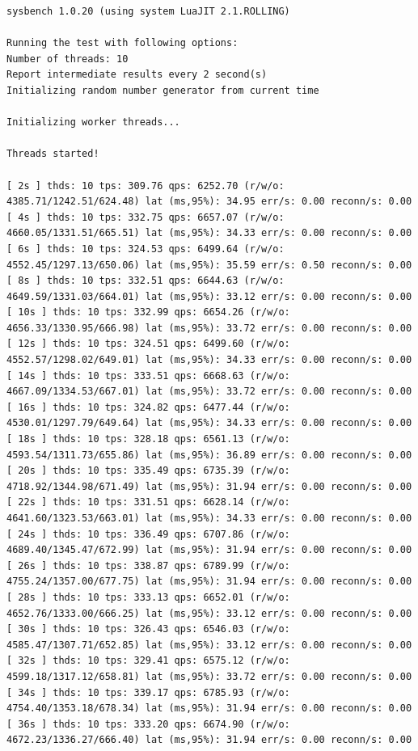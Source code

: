 \documentclass{article}
\begin{document}
\begin{verbatim}
sysbench 1.0.20 (using system LuaJIT 2.1.ROLLING)

Running the test with following options:
Number of threads: 10
Report intermediate results every 2 second(s)
Initializing random number generator from current time

Initializing worker threads...

Threads started!

[ 2s ] thds: 10 tps: 309.76 qps: 6252.70 (r/w/o: 4385.71/1242.51/624.48) lat (ms,95%): 34.95 err/s: 0.00 reconn/s: 0.00
[ 4s ] thds: 10 tps: 332.75 qps: 6657.07 (r/w/o: 4660.05/1331.51/665.51) lat (ms,95%): 34.33 err/s: 0.00 reconn/s: 0.00
[ 6s ] thds: 10 tps: 324.53 qps: 6499.64 (r/w/o: 4552.45/1297.13/650.06) lat (ms,95%): 35.59 err/s: 0.50 reconn/s: 0.00
[ 8s ] thds: 10 tps: 332.51 qps: 6644.63 (r/w/o: 4649.59/1331.03/664.01) lat (ms,95%): 33.12 err/s: 0.00 reconn/s: 0.00
[ 10s ] thds: 10 tps: 332.99 qps: 6654.26 (r/w/o: 4656.33/1330.95/666.98) lat (ms,95%): 33.72 err/s: 0.00 reconn/s: 0.00
[ 12s ] thds: 10 tps: 324.51 qps: 6499.60 (r/w/o: 4552.57/1298.02/649.01) lat (ms,95%): 34.33 err/s: 0.00 reconn/s: 0.00
[ 14s ] thds: 10 tps: 333.51 qps: 6668.63 (r/w/o: 4667.09/1334.53/667.01) lat (ms,95%): 33.72 err/s: 0.00 reconn/s: 0.00
[ 16s ] thds: 10 tps: 324.82 qps: 6477.44 (r/w/o: 4530.01/1297.79/649.64) lat (ms,95%): 34.33 err/s: 0.00 reconn/s: 0.00
[ 18s ] thds: 10 tps: 328.18 qps: 6561.13 (r/w/o: 4593.54/1311.73/655.86) lat (ms,95%): 36.89 err/s: 0.00 reconn/s: 0.00
[ 20s ] thds: 10 tps: 335.49 qps: 6735.39 (r/w/o: 4718.92/1344.98/671.49) lat (ms,95%): 31.94 err/s: 0.00 reconn/s: 0.00
[ 22s ] thds: 10 tps: 331.51 qps: 6628.14 (r/w/o: 4641.60/1323.53/663.01) lat (ms,95%): 34.33 err/s: 0.00 reconn/s: 0.00
[ 24s ] thds: 10 tps: 336.49 qps: 6707.86 (r/w/o: 4689.40/1345.47/672.99) lat (ms,95%): 31.94 err/s: 0.00 reconn/s: 0.00
[ 26s ] thds: 10 tps: 338.87 qps: 6789.99 (r/w/o: 4755.24/1357.00/677.75) lat (ms,95%): 31.94 err/s: 0.00 reconn/s: 0.00
[ 28s ] thds: 10 tps: 333.13 qps: 6652.01 (r/w/o: 4652.76/1333.00/666.25) lat (ms,95%): 33.12 err/s: 0.00 reconn/s: 0.00
[ 30s ] thds: 10 tps: 326.43 qps: 6546.03 (r/w/o: 4585.47/1307.71/652.85) lat (ms,95%): 33.12 err/s: 0.00 reconn/s: 0.00
[ 32s ] thds: 10 tps: 329.41 qps: 6575.12 (r/w/o: 4599.18/1317.12/658.81) lat (ms,95%): 33.72 err/s: 0.00 reconn/s: 0.00
[ 34s ] thds: 10 tps: 339.17 qps: 6785.93 (r/w/o: 4754.40/1353.18/678.34) lat (ms,95%): 31.94 err/s: 0.00 reconn/s: 0.00
[ 36s ] thds: 10 tps: 333.20 qps: 6674.90 (r/w/o: 4672.23/1336.27/666.40) lat (ms,95%): 31.94 err/s: 0.00 reconn/s: 0.00

\end{verbatim}
\end{document}
